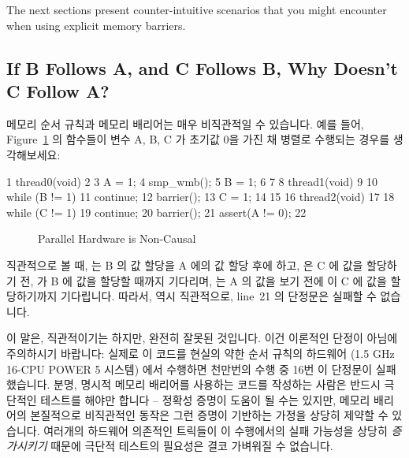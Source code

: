 The next sections present counter-intuitive scenarios that you might
encounter when using explicit memory barriers.
\fi

\subsection{If B Follows A, and C Follows B, Why Doesn't C Follow A?}
\label{sec:advsync:If B Follows A, and C Follows B, Why Doesn't C Follow A?}

메모리 순서 규칙과 메모리 배리어는 매우 비직관적일 수 있습니다.
예를 들어, Figure~\ref{fig:advsync:Parallel Hardware is Non-Causal} 의 함수들이
변수 A, B, C 가 초기값 0을 가진 채 병렬로 수행되는 경우를 생각해보세요:

{ \scriptsize
\begin{verbbox}
  1 thread0(void)
  2 {
  3   A = 1;
  4   smp_wmb();
  5   B = 1;
  6 }
  7
  8 thread1(void)
  9 {
 10   while (B != 1)
 11     continue;
 12   barrier();
 13   C = 1;
 14 }
 15
 16 thread2(void)
 17 {
 18   while (C != 1)
 19     continue;
 20   barrier();
 21   assert(A != 0);
 22 }
\end{verbbox}
}
\begin{figure}[htbp]
\centering
\theverbbox
\caption{Parallel Hardware is Non-Causal}
\label{fig:advsync:Parallel Hardware is Non-Causal}
\end{figure}

직관적으로 볼 때,  는 B 의 값 할당을 A 에의 값 할당 후에 하고,
 은 C 에 값을 할당하기 전,  가 B 에 값을 할당할
때까지 기다리며,  는 A 의 값을 보기 전에  이 C 에
값을 할당하기까지 기다립니다.
따라서, 역시 직관적으로, line~21 의 단정문은 실패할 수 없습니다.

이 말은, 직관적이기는 하지만, 완전히 잘못된 것입니다.
이건 이론적인 단정이 아님에 주의하시기 바랍니다: 실제로 이 코드를 현실의 약한
순서 규칙의 하드웨어 (1.5 GHz 16-CPU POWER 5 시스템) 에서 수행하면 천만번의
수행 중 16번 이 단정문이 실패했습니다.
분명, 명시적 메모리 배리어를 사용하는 코드를 작성하는 사람은 반드시 극단적인
테스트를 해야만 합니다 -- 정확성 증명이 도움이 될 수는 있지만, 메모리 배리어의
본질적으로 비직관적인 동작은 그런 증명이 기반하는 가정을 상당히 제약할 수
있습니다.
여러개의 하드웨어 의존적인 트릭들이 이 수행에서의 실패 가능성을 상당히
\emph{증가시키기} 때문에 극단적 테스트의 필요성은 결코 가벼워질 수 없습니다.
\iffalse

